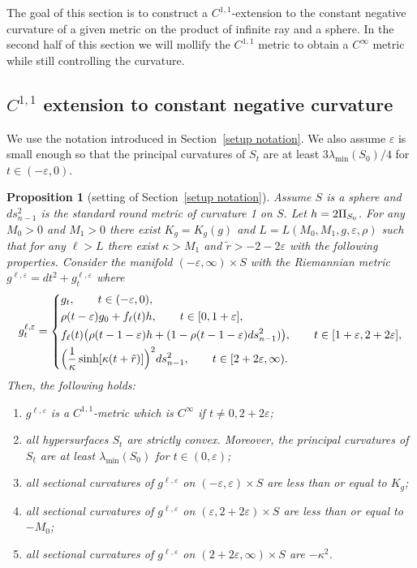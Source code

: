 \documentclass[10pt]{amsart}
\newenvironment{enumeratea}
{\bgroup\def\theenumi{\alph{enumi}}\begin{enumerate}}
{\end{enumerate}\egroup}
\newtheorem{proposition}[theorem]{Proposition}
\theoremstyle{definition}
\let\eps\varepsilon
\newcommand{\RomanNumeralCaps}[1]
{\MakeUppercase{\romannumeral #1}}
\newcommand{\II}{\textup{\RomanNumeralCaps{2}}}
\renewcommand{\>}{{\rangle}}
\newcommand{\<}{{\langle}}
\begin{document}
The goal of this section is to construct a $C^{1,1}$-extension to the constant negative curvature of a given metric on the product of infinite ray and a sphere. In the second half of this section we will mollify the $C^{1,1}$ metric to obtain a $C^\infty$ metric while still controlling the curvature.

\subsection{\texorpdfstring{$C^{1,1}$}{C} extension to constant negative curvature}\label{C1 extension}
We use the notation introduced in Section~\ref{setup notation}. We also assume $\eps$ is small enough so that the principal curvatures of $S_t$ are at least $3\lambda_{\min}(S_0)/4$ for $t\in(-\eps, 0)$.

\begin{proposition}[setting of Section~\ref{setup notation}]\label{prop: C11 extension}
Assume $S$ is a sphere and $ds_{n-1}^2$ is the standard round metric of curvature 1 on $S$. Let $h=2\II_{S_0}$. For any $M_0>0$ and $M_1>0$ there exist $K_g=K_g(g)$ and $L=L(M_0, M_1,g,\eps,\rho)$ such that for any $\ell>L$ there exist $\kappa>M_1$ and $\tilde r>-2-2\eps$ with the following properties. Consider the manifold $(-\eps,\infty)\times S$ with the Riemannian metric $g^{\ell,\eps}=dt^2+g^{\ell,\eps}_t$ where
\begin{equation*}
g^{\ell,\eps}_t = \left\{\begin{aligned} &g_t, \qquad t\in(-\eps,0),\\
&\rho(t-\eps)g_0+f_{\ell}(t)h, \qquad t\in[0,1+\eps],\\
&f_{\ell}(t)\bigl(\rho(t-1-\eps)h+(1-\rho(t-1-\eps)ds^2_{n-1})\bigr), \qquad t\in[1+\eps,2+2\eps],\\
&\Bigl(\frac{1}{\kappa}\sinh[\kappa(t+\tilde r)] \Bigr)^2ds^2_{n-1}, \qquad t\in[2+2\eps,\infty).
\end{aligned}\right.
\end{equation*}
Then, the following holds:
\begin{enumeratea}
\item\label{prop: C11 extensiona} $g^{\ell,\eps}$ is a $C^{1,1}$-metric which is $C^\infty$ if $t\neq 0, 2+2\eps$;
\item\label{prop: C11 extensionb} all hypersurfaces $S_t$ are strictly convex. Moreover, the principal curvatures of~$S_t$ are at least $\lambda_{\min}(S_0)$ for $t\in(0,\eps)$;
\item\label{prop: C11 extensionc} all sectional curvatures of $g^{\ell,\eps}$ on $(-\eps,\eps)\times S$ are less than or equal to $K_g$;
\item\label{prop: C11 extensiond} all sectional curvatures of $g^{\ell,\eps}$ on $(\eps,2+2\eps)\times S$ are less than or equal to $-M_0$;
\item\label{prop: C11 extensione} all sectional curvatures of $g^{\ell,\eps}$ on $(2+2\eps, \infty)\times S$ are $-\kappa^2$.
\end{enumeratea}
\end{proposition}
\end{document}
